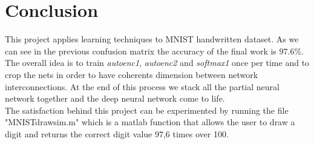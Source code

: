 \chapter*{Conclusion}
This project applies learning techniques to MNIST handwritten dataset. As we can see in the previous confusion matrix the accuracy of the final work is $97.6\%$. The overall idea is to train \emph{autoenc1},  \emph{autoenc2} and \emph{softmax1} once per time and to crop the nets in order to have coherents dimension between network interconnections. At the end of this process we stack all the partial neural network together and the deep neural network come to life. \\The satisfaction behind this project can be experimented by running the file "MNIST\textunderscore drawsim.m" which is a matlab function that allows the user to draw a digit and returns the correct digit value 97,6 times over 100.